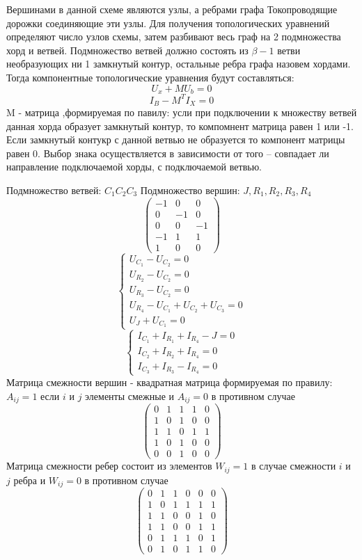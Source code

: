 \documentclass{article}
\begin{document}
Вершинами в данной схеме являются узлы, а ребрами графа Токопроводящие дорожки соединяющие эти узлы. Для получения топологических уравнений определяют число узлов схемы, затем разбивают весь граф
на 2 подмножества хорд и ветвей. Подмножество ветвей должно состоять из $\beta - 1$ ветви необразующих ни 1 замкнутый контур, остальные ребра графа назовем хордами. Тогда компонентные топологические уравнения будут составляться:
$$
U_x + M U_b = 0
$$
$$
I_B - M^T I_X = 0
$$
M - матрица ,формируемая по павилу: усли при подключении к множеству ветвей данная хорда образует замкнутый контур, то компомнент матрица равен 1 или -1. Если замкнутый контукр с данной ветвью не образуется то компонент матрицы равен 0. Выбор знака осуществляется в зависимости от того -- совпадает ли направление подключаемой хорды, с подключаемой ветвью.

Подмножество ветвей: $C_1 C_2 C_3$
Подмножество вершин: $J, R_1, R_2, R_3, R_4$
$$
\begin{pmatrix}
	-1 & 0 & 0\\
	0 & -1 & 0\\
	0 & 0 & -1\\
	-1 & 1 & 1\\
	1 & 0 & 0
\end{pmatrix}
$$
$$
\begin{cases}
	U_{C_1} - U_{C_2} = 0\\
	U_{R_2} - U_{C_2} = 0\\
	U_{R_3} - U_{C_2} = 0\\
	U_{R_4} - U_{C_1} + U_{C_2} + U_{C_3} = 0\\
	U_J + U_{C_1} = 0
\end{cases}
$$
$$
\begin {cases}
	I_{C_1} + I_{R_1} + I_{R_4} - J = 0\\
	I_{C_2} + I_{R_2} + I_{R_4} = 0\\
	I_{C_3} + I_{R_3} - I_{R_4} = 0
\end{cases}
$$
Матрица смежности вершин - квадратная матрица формируемая по правилу: $A_{ij} = 1$ если $i$ и $j$ элементы смежные и $A_{ij} = 0$ в противном случае
$$
\begin{pmatrix}
	0 & 1 & 1 & 1 & 0\\
	1 & 0 & 1 & 0 & 0\\
	1 & 1 & 0 & 1 & 1\\
	1 & 0 & 1 & 0 & 0\\
	0 & 0 & 1 & 0 & 0
\end{pmatrix}
$$
Матрица смежности ребер состоит из элементов $W_{ij} = 1$ в случае смежности $i$ и $j$ ребра и $W_{ij} = 0$ в противном случае
$$
\begin{pmatrix}
0 & 1 &1 & 0 & 0 & 0\\
1 & 0 & 1 & 1 & 1 & 1\\
1 & 1 & 0 & 0 & 1 & 0\\
1 & 1 & 0 & 0 & 1 & 1\\
0 & 1 & 1 & 1 & 0 & 1\\
0 & 1 & 0 & 1 & 1 & 0
\end{pmatrix}
$$
\end{document}
